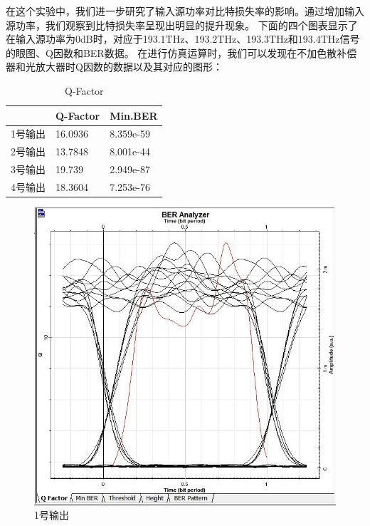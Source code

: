 \documentclass[12pt, a4paper, oneside]{article}
\begin{document}
\begin{spacing}{2.0}
在这个实验中，我们进一步研究了输入源功率对比特损失率的影响。通过增加输入源功率，我们观察到比特损失率呈现出明显的提升现象。
下面的四个图表显示了在输入源功率为0dB时，对应于193.1THz、193.2THz、193.3THz和193.4THz信号的眼图、Q因数和BER数据。
在进行仿真运算时，我们可以发现在不加色散补偿器和光放大器时Q因数的数据以及其对应的图形：
\begin{table}[H]
  \centering
  \caption{Q-Factor}
  \begin{tabular}{|l|l|l|} 
  \hline
    & Q-Factor & Min.BER    \\ 
  \hline
  1号输出 & 16.0936  & 8.359e-59  \\ 
  \hline
  2号输出 & 13.7848  & 8.001e-44  \\ 
  \hline
  3号输出 & 19.739   & 2.949e-87  \\ 
  \hline
  4号输出 & 18.3604  & 7.253e-76  \\
  \hline
  \end{tabular}
  \end{table}
\begin{figure}[H]
    \begin{minipage}[t]{0.5\linewidth}
        \centering
        \includegraphics[scale=0.5]{Q-factor (1).jpg}
        \caption{1号输出}
        \label{fig:side:a}
      \end{minipage}%
      \begin{minipage}[t]{0.5\linewidth}

\end{minipage}
\end{figure}
\end{spacing}
\end{document}
